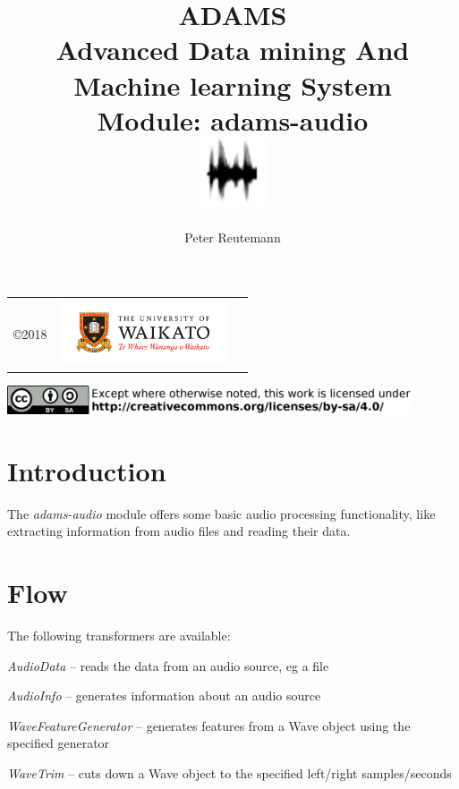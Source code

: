 \documentclass[a4paper]{book}
\title{
  \textbf{ADAMS} \\
  {\Large \textbf{A}dvanced \textbf{D}ata mining \textbf{A}nd \textbf{M}achine
  learning \textbf{S}ystem} \\
  {\Large Module: adams-audio} \\
  \vspace{1cm}
  \includegraphics[width=2cm]{images/audio-module.png} \\
}
\author{
  Peter Reutemann
}
\begin{document}
\begin{titlepage}
\maketitle

\thispagestyle{empty}
\center
\begin{table}[b]
	\begin{tabular}{c l l}
		\parbox[c][2cm]{2cm}{\copyright 2018} &
		\parbox[c][2cm]{5cm}{\includegraphics[width=5cm]{images/coat_of_arms.pdf}} \\
	\end{tabular}
	\includegraphics[width=12cm]{images/cc.png} \\
\end{table}

\end{titlepage}

\tableofcontents

\chapter{Introduction}
The \textit{adams-audio} module offers some basic audio processing functionality,
like extracting information from audio files and reading their data.

\chapter{Flow}
The following transformers are available:
\begin{tight_itemize}
  \item \textit{AudioData} -- reads the data from an audio source, eg a file
  \item \textit{AudioInfo} -- generates information about an audio source
  \item \textit{WaveFeatureGenerator} -- generates features from a Wave object
  using the specified generator
  \item \textit{WaveTrim} -- cuts down a Wave object to the specified left/right
  samples/seconds
\end{tight_itemize}
\end{document}
